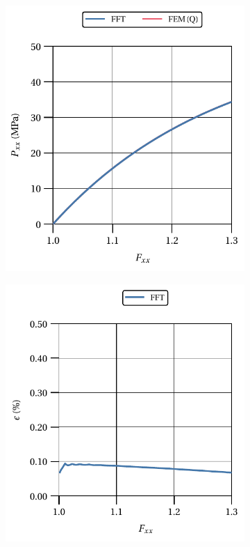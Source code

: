 \begin{figure}[hbt]
  \centering
	\begin{subfigure}[b]{0.49\textwidth}
    \centering
    \includegraphics[width=\textwidth]{figures/hencky_2D_normal_material_response}
    \caption{}
    \label{subfig:hencky_2D_normal_material_response}
  \end{subfigure}
  \begin{subfigure}[b]{0.49\textwidth}
    \centering
    \includegraphics[width=\textwidth]{figures/hencky_2D_normal_material_response_error}

\end{subfigure}
\end{figure}
